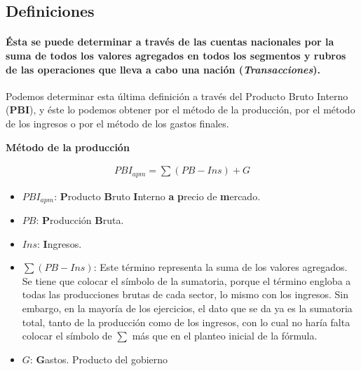 \documentclass[12pt,a4paper]{article}
\newcommand{\definicion}[1]{\paragraph{\indent #1} \hspace{0pt}}
\begin{document}
	\subsection{Definiciones}

    
	\definicion{
    	Ésta se puede determinar a través de las cuentas nacionales por la suma de todos los valores agregados en todos los segmentos y rubros de las operaciones que lleva a cabo una nación (\textsl{Transacciones}).}
    \par{
    	Podemos determinar esta última definición a través del Producto Bruto Interno (\textbf{PBI}), y éste lo podemos obtener por el método de la producción, por el método de los ingresos o por el método de los gastos finales.}
    
    
    \hrulefill
    
    \textbf{Método de la producción}
    
    \begin{align}
		{PBI}_{apm} = \sum ( PB - Ins ) + G
        \label{metodo_de_la_produccion}
	\end{align}
    
    \begin{itemize}
		\item ${PBI}_{apm}$: \textbf{P}roducto \textbf{B}ruto \textbf{I}nterno \textbf{a} \textbf{p}recio de \textbf{m}ercado.
        
        \item $PB$: \textbf{P}roducción \textbf{B}ruta.
        
        \item $Ins$: \textbf{I}ngresos.
        
        \item $\sum ( PB - Ins )$: Este término representa la suma de los valores agregados.
	        Se tiene que colocar el símbolo de la sumatoria, porque el término engloba a todas las producciones brutas de cada sector, lo mismo con los ingresos.
        	Sin embargo, en la mayoría de los ejercicios, el dato que se da ya es la sumatoria total, tanto de la producción como de los ingresos, con lo cual no haría falta colocar el símbolo de $\sum$ más que en el planteo inicial de la fórmula.
        
        \item $G$: \textbf{G}astos. Producto del gobierno
        
	\end{itemize}
    
\end{document}
